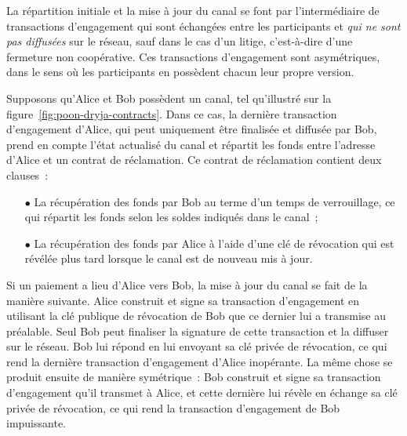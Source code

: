 %
%
%

La répartition initiale et la mise à jour du canal se font par l'intermédiaire de transactions d'engagement qui sont échangées entre les participants et \emph{qui ne sont pas diffusées} sur le réseau, sauf dans le cas d'un litige, c'est-à-dire d'une fermeture non coopérative. Ces transactions d'engagement sont asymétriques, dans le sens où les participants en possèdent chacun leur propre version.

Supposons qu'Alice et Bob possèdent un canal, tel qu'illustré sur la figure~\ref{fig:poon-dryja-contracts}. Dans ce cas, la dernière transaction d'engagement d'Alice, qui peut uniquement être finalisée et diffusée par Bob, prend en compte l'état actualisé du canal et répartit les fonds entre l'adresse d'Alice et un contrat de réclamation. Ce contrat de réclamation contient deux clauses~:

\begin{itemize}
\item[$\bullet$] La récupération des fonds par Bob au terme d'un temps de verrouillage, ce qui répartit les fonds selon les soldes indiqués dans le canal~;
\item[$\bullet$] La récupération des fonds par Alice à l'aide d'une clé de révocation qui est révélée plus tard lorsque le canal est de nouveau mis à jour.
\end{itemize}

Si un paiement a lieu d'Alice vers Bob, la mise à jour du canal se fait de la manière suivante. Alice construit et signe sa transaction d'engagement en utilisant la clé publique de révocation de Bob que ce dernier lui a transmise au préalable. Seul Bob peut finaliser la signature de cette transaction et la diffuser sur le réseau. Bob lui répond en lui envoyant sa clé privée de révocation, ce qui rend la dernière transaction d'engagement d'Alice inopérante. La même chose se produit ensuite de manière symétrique~: Bob construit et signe sa transaction d'engagement qu'il transmet à Alice, et cette dernière lui révèle en échange sa clé privée de révocation, ce qui rend la transaction d'engagement de Bob impuissante.

